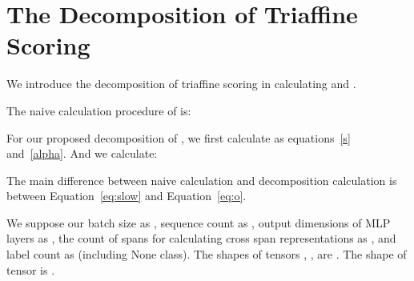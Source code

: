 \documentclass[11pt]{article}
\begin{document}
\section{The Decomposition of Triaffine Scoring}
\label{appendix:decompose}
We introduce the decomposition of triaffine scoring in calculating  and .

The naive calculation procedure of  is:


For our proposed decomposition of , we first calculate  as equations~\ref{s} and~\ref{alpha}. And we calculate:

The main difference between naive calculation and decomposition calculation is between Equation~\ref{eq:slow} and Equation~\ref{eq:o}.


We suppose our batch size as , sequence count as , output dimensions of MLP layers as , the count of spans for calculating cross span representations as , and label count as  (including None class). 
The shapes of tensors , ,  are .
The shape of tensor  is .
\end{document}
